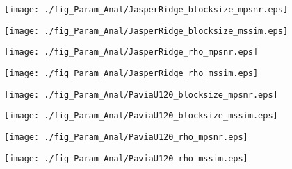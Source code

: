 \begin{figure*}[t]
    \begin{center}
        \begin{minipage}{0.240\hsize}
            \centerline{\texttt{[image: ./fig\_Param\_Anal/JasperRidge\_blocksize\_mpsnr.eps]}}
        \end{minipage}
        \begin{minipage}{0.240\hsize}
            \centerline{\texttt{[image: ./fig\_Param\_Anal/JasperRidge\_blocksize\_mssim.eps]}}
        \end{minipage}
        \begin{minipage}{0.240\hsize}
            \centerline{\texttt{[image: ./fig\_Param\_Anal/JasperRidge\_rho\_mpsnr.eps]}}
        \end{minipage}
        \begin{minipage}{0.240\hsize}
            \centerline{\texttt{[image: ./fig\_Param\_Anal/JasperRidge\_rho\_mssim.eps]}}
        \end{minipage}

        \vspace{1mm}

        \begin{minipage}{0.240\hsize}
            \centerline{\texttt{[image: ./fig\_Param\_Anal/PaviaU120\_blocksize\_mpsnr.eps]}}
        \end{minipage}
        \begin{minipage}{0.240\hsize}
            \centerline{\texttt{[image: ./fig\_Param\_Anal/PaviaU120\_blocksize\_mssim.eps]}}
        \end{minipage}
        \begin{minipage}{0.240\hsize}
            \centerline{\texttt{[image: ./fig\_Param\_Anal/PaviaU120\_rho\_mpsnr.eps]}}
        \end{minipage}
        \begin{minipage}{0.240\hsize}
            \centerline{\texttt{[image: ./fig\_Param\_Anal/PaviaU120\_rho\_mssim.eps]}}
        \end{minipage}
        

\end{center}
\end{figure*}
